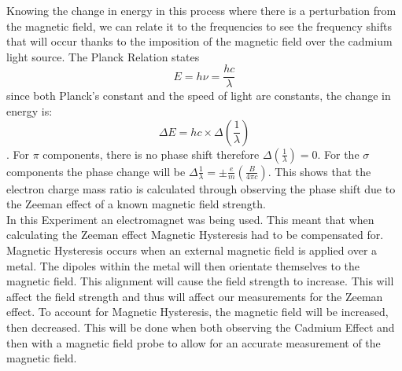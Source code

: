 \documentclass[a4paper,11pt]{article}
\begin{document}
Knowing the change in energy in this process where there is a perturbation from the magnetic field, we can relate it to the frequencies to see the frequency shifts that will occur thanks to the imposition of the magnetic field over the cadmium light source. The Planck Relation states
\begin{equation}
    E=h\nu=\frac{hc}{\lambda} \label{eq: Planck's Relation}
\end{equation}
since both Planck’s constant and the speed of light are constants, the change in energy is: \begin{equation}
    \Delta E=hc\times\Delta(\frac{1}{\lambda})
\end{equation} \cite{Planck}. For $\pi$ components, there is no phase shift therefore $\Delta\left(\frac{1}{\lambda}\right)=0$. For the $\sigma$ components the phase change will be $\Delta\frac{1}{\lambda}=\pm\frac{e}{m}(\frac{B}{4\pi c})$. This shows that the electron charge mass ratio is calculated through observing the phase shift due to the Zeeman effect of a known magnetic field strength.\\

In this Experiment an electromagnet was being used. This meant that when calculating the Zeeman effect Magnetic Hysteresis had to be compensated for. Magnetic Hysteresis occurs when an external magnetic field is applied over a metal. The dipoles within the metal will then orientate themselves to the magnetic field. This alignment will cause the field strength to increase. This will affect the field strength and thus will affect our measurements for the Zeeman effect. To account for Magnetic Hysteresis, the magnetic field will be increased, then decreased. This will be done when both observing the Cadmium Effect and then with a magnetic field probe to allow for an accurate measurement of the magnetic field.\\
\end{document}
